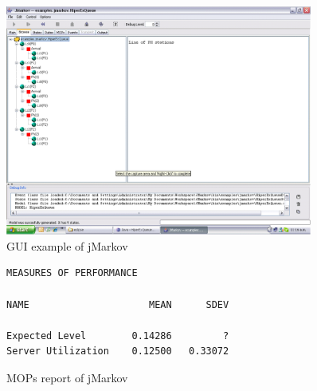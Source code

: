 \documentclass[11pt,letterpaper]{article}
\begin{document}
\begin{figure}[bt]
  \centering
  \includegraphics[width=0.9\textwidth,clip]{pics/GUIexampleQBD}
  \caption{GUI example of jMarkov}\label{fg:GUIExample}
\end{figure}

\begin{figure}[htb]
\small
\begin{lstlisting}
MEASURES OF PERFORMANCE

NAME                     MEAN      SDEV

Expected Level        0.14286         ?
Server Utilization    0.12500   0.33072

\end{lstlisting}
\caption{MOPs report of jMarkov}\label{fg:MOPs}
\end{figure}









\end{document}
